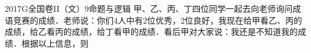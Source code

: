
\begin{problem}{2017}{G}{全国卷II（文）}{9}{命题与逻辑}
甲、乙、丙、丁四位同学一起去向老师询问成语竞赛的成绩．老师说：你们4人中有2位优秀，2位良好，我现在给甲看乙、丙的成绩，给乙看丙的成绩，给丁看甲的成绩．看后甲对大家说：我还是不知道我的成绩．根据以上信息，则
\begin{choices}
\end{choices}
\end{problem}

\begin{answer}

\end{answer}

\begin{solutions}

\end{solutions}